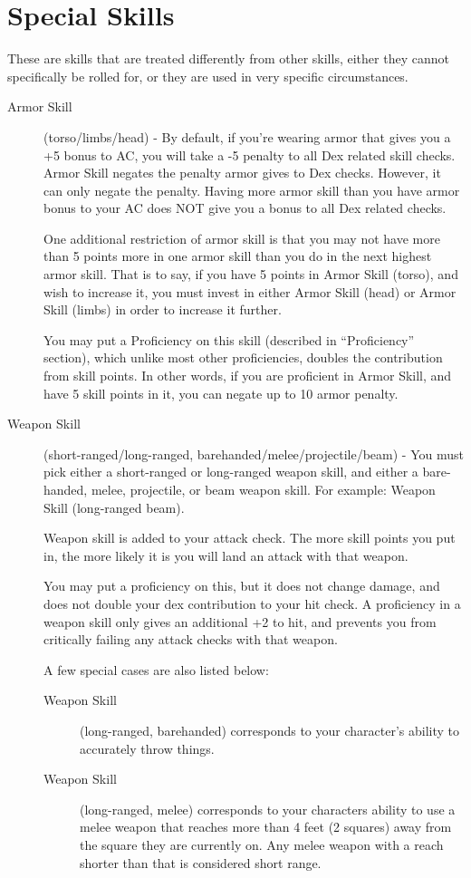 \section{Special Skills}
These are skills that are treated differently from other skills, either they cannot specifically be rolled for, or they are used in very specific circumstances.

\begin{description}
\item[Armor Skill] (torso/limbs/head) - By default, if you’re wearing armor that gives you a +5 bonus to AC, you will take a -5 penalty to all Dex related skill checks. Armor Skill negates the penalty armor gives to Dex checks. However, it can only negate the penalty. Having more armor skill than you have armor bonus to your AC does NOT give you a bonus to all Dex related checks.

One additional restriction of armor skill is that you may not have more than 5 points more in one armor skill than you do in the next highest armor skill. That is to say, if you have 5 points in Armor Skill (torso), and wish to increase it, you must invest in either Armor Skill (head) or Armor Skill (limbs) in order to increase it further.

You may put a Proficiency on this skill (described in “Proficiency” section), which unlike most other proficiencies, doubles the contribution from skill points. In other words, if you are proficient in Armor Skill, and have 5 skill points in it, you can negate up to 10 armor penalty.

\item[Weapon Skill] (short-ranged/long-ranged, barehanded/melee/projectile/beam) - You must pick either a short-ranged or long-ranged weapon skill, and either a bare-handed, melee, projectile, or beam weapon skill. For example: Weapon Skill (long-ranged beam).

Weapon skill is added to your attack check. The more skill points you put in, the more likely it is you will land an attack with that weapon.

You may put a proficiency on this, but it does not change damage, and does not double your dex contribution to your hit check. A proficiency in a weapon skill only gives an additional +2 to hit, and prevents you from critically failing any attack checks with that weapon.

A few special cases are also listed below:
\begin{description}
\item[Weapon Skill] (long-ranged, barehanded) corresponds to your character’s ability to accurately throw things.
\item[Weapon Skill] (long-ranged, melee) corresponds to your characters ability to use a melee weapon that reaches more than 4 feet (2 squares) away from the square they are currently on. Any melee weapon with a reach shorter than that is considered short range.
\end{description}


\end{description}
